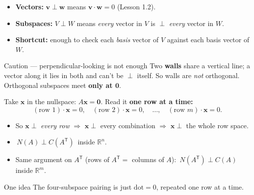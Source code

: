 \documentclass[aspectratio=169, 11pt]{beamer}
\newcommand{\vv}{\mathbf{v}}
\newcommand{\ww}{\mathbf{w}}
\newcommand{\xx}{\mathbf{x}}
\newcommand{\zero}{\mathbf{0}}
\newcommand{\T}{\mathsf{T}}
\begin{document}
\begin{frame}[t, plain]
  \begin{itemize}
    \setlength{\itemsep}{6pt}
    \item \textbf{Vectors:} $\vv\perp\ww$ means $\vv\cdot\ww=0$ (Lesson 1.2).
    \item \textbf{Subspaces:} $V\perp W$ means \emph{every} vector in $V$ is $\perp$ \emph{every} vector in $W$.
    \item \textbf{Shortcut:} enough to check each \emph{basis} vector of $V$ against each basis vector of $W$.
  \end{itemize}
  \vspace{4pt}
  \begin{block}{Caution --- perpendicular-looking is not enough}
    Two \textbf{walls} share a vertical line; a vector along it lies in both and can't be $\perp$ itself.
    So walls are \emph{not} orthogonal. Orthogonal subspaces meet \textbf{only at $\zero$}.
  \end{block}
\end{frame}

\begin{frame}[t, plain]
  Take $\xx$ in the nullspace: $A\xx=\zero$. Read it \textbf{one row at a time:}
  \[
    (\text{row }1)\cdot\xx=0,\quad (\text{row }2)\cdot\xx=0,\quad\dots,\quad (\text{row }m)\cdot\xx=0.
  \]
  \begin{itemize}
    \setlength{\itemsep}{5pt}
    \item So $\xx\perp$ \emph{every row} $\Rightarrow$ $\xx\perp$ every combination $\Rightarrow$ $\xx\perp$ the whole row space.
    \item $\boxed{\,N(A)\perp C(A^{\T})\,}$ inside $\mathbb{R}^n$.
    \item Same argument on $A^{\T}$ (rows of $A^{\T}=$ columns of $A$): $\boxed{\,N(A^{\T})\perp C(A)\,}$ inside $\mathbb{R}^m$.
  \end{itemize}
  \vspace{2pt}
  \begin{block}{One idea}
    The four-subspace pairing is just $\text{dot}=0$, repeated one row at a time.
  \end{block}
\end{frame}
\end{document}
